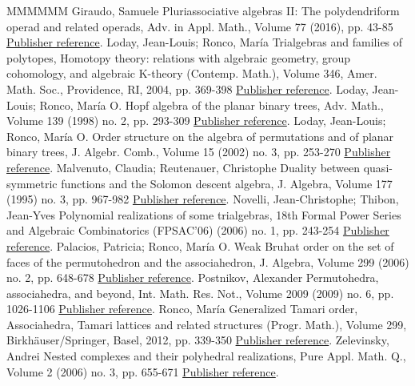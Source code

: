\documentclass[11pt]{article}
\theoremstyle{definition}
\numberwithin{equation}{section}
\numberwithin{equation}{section}
\begin{document}
\begin{thebibliography}{MMMMMM}
 Giraudo, Samuele Pluriassociative algebras II: The polydendriform operad and related operads, Adv. in Appl. Math., Volume 77 (2016), pp. 43-85 \href{https://alco.centre-mersenne.org/articles/10.5802/alco.401/#Samuele}{Publisher reference}.
 Loday, Jean-Louis; Ronco, María Trialgebras and families of polytopes, Homotopy theory: relations with algebraic geometry, group cohomology, and algebraic K-theory (Contemp. Math.), Volume 346, Amer. Math. Soc., Providence, RI, 2004, pp. 369-398 \href{https://alco.centre-mersenne.org/articles/10.5802/alco.401/#LR}{Publisher reference}.
 Loday, Jean-Louis; Ronco, María O. Hopf algebra of the planar binary trees, Adv. Math., Volume 139 (1998) no. 2, pp. 293-309 \href{https://alco.centre-mersenne.org/articles/10.5802/alco.401/#LR-planar-Hopf}{Publisher reference}.
 Loday, Jean-Louis; Ronco, María O. Order structure on the algebra of permutations and of planar binary trees, J. Algebr. Comb., Volume 15 (2002) no. 3, pp. 253-270 \href{https://alco.centre-mersenne.org/articles/10.5802/alco.401/#LR02}{Publisher reference}.
 Malvenuto, Claudia; Reutenauer, Christophe Duality between quasi-symmetric functions and the Solomon descent algebra, J. Algebra, Volume 177 (1995) no. 3, pp. 967-982 \href{https://alco.centre-mersenne.org/articles/10.5802/alco.401/#MalvReut}{Publisher reference}.
 Novelli, Jean-Christophe; Thibon, Jean-Yves Polynomial realizations of some trialgebras, 18th Formal Power Series and Algebraic Combinatorics (FPSAC’06) (2006) no. 1, pp. 243-254 \href{https://alco.centre-mersenne.org/articles/10.5802/alco.401/#HNT}{Publisher reference}.
 Palacios, Patricia; Ronco, María O. Weak Bruhat order on the set of faces of the permutohedron and the associahedron, J. Algebra, Volume 299 (2006) no. 2, pp. 648-678 \href{https://alco.centre-mersenne.org/articles/10.5802/alco.401/#PalaciosRonco}{Publisher reference}.
 Postnikov, Alexander Permutohedra, associahedra, and beyond, Int. Math. Res. Not., Volume 2009 (2009) no. 6, pp. 1026-1106 \href{https://alco.centre-mersenne.org/articles/10.5802/alco.401/#P09}{Publisher reference}.
 Ronco, María Generalized Tamari order, Associahedra, Tamari lattices and related structures (Progr. Math.), Volume 299, Birkhäuser/Springer, Basel, 2012, pp. 339-350 \href{https://alco.centre-mersenne.org/articles/10.5802/alco.401/#RoncoGTO}{Publisher reference}.
 Zelevinsky, Andrei Nested complexes and their polyhedral realizations, Pure Appl. Math. Q., Volume 2 (2006) no. 3, pp. 655-671 \href{https://alco.centre-mersenne.org/articles/10.5802/alco.401/#Zel06}{Publisher reference}.
\end{thebibliography}
\end{document}
